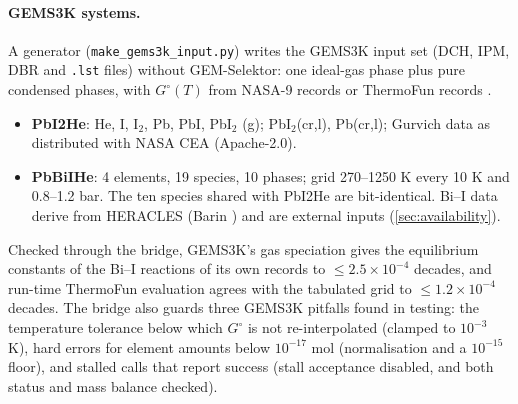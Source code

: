 \documentclass[11pt,a4paper]{article}
\begin{document}
\paragraph{GEMS3K systems.} A generator (\texttt{make\_gems3k\_input.py})
writes the GEMS3K input set (DCH, IPM, DBR and \texttt{.lst} files)
without GEM-Selektor: one ideal-gas phase plus pure condensed phases,
with $G^\circ(T)$ from NASA-9 records \cite{Gurvich1991thermodynamic}
or ThermoFun records \cite{Miron2023thermofun}.
\begin{itemize}
\item \textbf{PbI2He}: He, I, I$_2$, Pb, PbI, PbI$_2$ (g); PbI$_2$(cr,l),
  Pb(cr,l); Gurvich data as distributed with NASA CEA (Apache-2.0).
\item \textbf{PbBiIHe}: 4 elements, 19 species, 10 phases; grid
  270--1250 K every 10 K and 0.8--1.2 bar. The ten species shared with
  PbI2He are bit-identical. Bi--I data derive from HERACLES (Barin
  \cite{Barin1995thermochemical}) and are external inputs
  (\cref{sec:availability}).
\end{itemize}
Checked through the bridge, GEMS3K's gas speciation gives the
equilibrium constants of the Bi--I reactions of its own records to
$\le2.5\times10^{-4}$ decades, and run-time ThermoFun evaluation agrees
with the tabulated grid to $\le1.2\times10^{-4}$ decades. The bridge also guards three GEMS3K
pitfalls found in testing: the temperature tolerance below which $G^\circ$
is not re-interpolated (clamped to $10^{-3}$ K), hard errors for element
amounts below $10^{-17}$ mol (normalisation and a $10^{-15}$ floor), and
stalled calls that report success (stall acceptance disabled, and both
status and mass balance checked).
\end{document}
